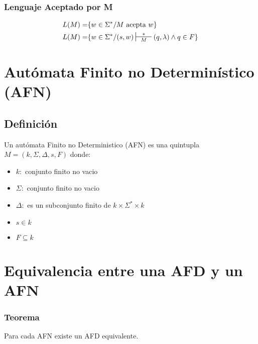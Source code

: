 \subsubsection{Lenguaje Aceptado por M}
\begin{align*}
L(M) = & \{ w\in\Sigma^* / M \text{ acepta } w\} \\
L(M) = & \{ w\in\Sigma^* / (s,w) \sststile{M}{\hspace{0.25cm} * \hspace{0.25cm}} (q,\lambda) \wedge q\in F\}
\end{align*}
\section{Autómata Finito no Determinístico (AFN)}
\subsection{Definición}
Un autómata Finito no Deterministico (AFN) es una quintupla $M=(k,\Sigma,\Delta,s,F)$ donde:
\begin{itemize}
\item $k:$ conjunto finito no vacio
\item $\Sigma:$ conjunto finito no vacio
\item $\Delta:$ es un subconjunto finito de $k\times\Sigma^* \times k$
\item $s\in k$
\item $F\subseteq k$
\end{itemize}
\section{Equivalencia entre una AFD y un AFN}
\subsubsection{Teorema}
Para cada AFN existe un AFD equivalente.
